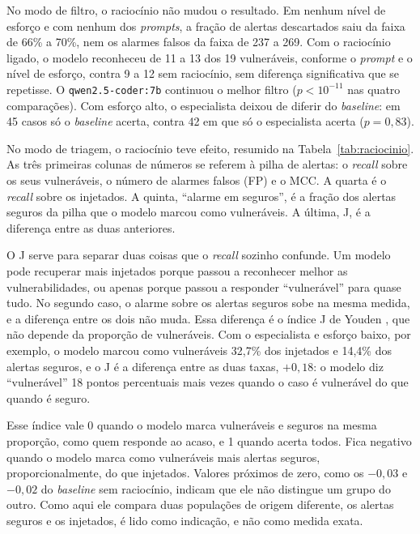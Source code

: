 No modo de filtro, o raciocínio não mudou o resultado. Em nenhum nível de esforço e com nenhum dos \textit{prompts}, a fração de alertas descartados saiu da faixa de 66\% a 70\%, nem os alarmes falsos da faixa de 237 a 269. Com o raciocínio ligado, o modelo reconheceu de 11 a 13 dos 19 vulneráveis, conforme o \textit{prompt} e o nível de esforço, contra 9 a 12 sem raciocínio, sem diferença significativa que se repetisse. O \texttt{qwen2.5-coder:7b} continuou o melhor filtro ($p < 10^{-11}$ nas quatro comparações). Com esforço alto, o especialista deixou de diferir do \textit{baseline}: em 45 casos só o \textit{baseline} acerta, contra 42 em que só o especialista acerta ($p = 0{,}83$).

No modo de triagem, o raciocínio teve efeito, resumido na Tabela~\ref{tab:raciocinio}. As três primeiras colunas de números se referem à pilha de alertas: o \textit{recall} sobre os seus vulneráveis, o número de alarmes falsos (FP) e o MCC. A quarta é o \textit{recall} sobre os injetados. A quinta, ``alarme em seguros'', é a fração dos alertas seguros da pilha que o modelo marcou como vulneráveis. A última, J, é a diferença entre as duas anteriores.

O J serve para separar duas coisas que o \textit{recall} sozinho confunde. Um modelo pode recuperar mais injetados porque passou a reconhecer melhor as vulnerabilidades, ou apenas porque passou a responder ``vulnerável'' para quase tudo. No segundo caso, o alarme sobre os alertas seguros sobe na mesma medida, e a diferença entre os dois não muda. Essa diferença é o índice J de Youden \cite{youden1950index}, que não depende da proporção de vulneráveis. Com o especialista e esforço baixo, por exemplo, o modelo marcou como vulneráveis 32,7\% dos injetados e 14,4\% dos alertas seguros, e o J é a diferença entre as duas taxas, $+0{,}18$: o modelo diz ``vulnerável'' 18 pontos percentuais mais vezes quando o caso é vulnerável do que quando é seguro.

Esse índice vale 0 quando o modelo marca vulneráveis e seguros na mesma proporção, como quem responde ao acaso, e 1 quando acerta todos. Fica negativo quando o modelo marca como vulneráveis mais alertas seguros, proporcionalmente, do que injetados. Valores próximos de zero, como os $-0{,}03$ e $-0{,}02$ do \textit{baseline} sem raciocínio, indicam que ele não distingue um grupo do outro. Como aqui ele compara duas populações de origem diferente, os alertas seguros e os injetados, é lido como indicação, e não como medida exata.


